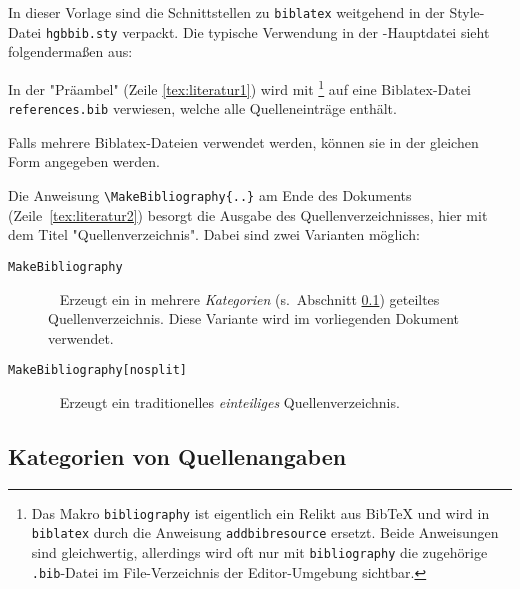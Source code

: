 In dieser Vorlage sind die Schnittstellen zu \texttt{biblatex} weitgehend in der Style-Datei \nolinkurl{hgbbib.sty}
verpackt. Die typische Verwendung in der \latex-Haupt\-datei sieht folgendermaßen aus:
%
%
In der "Präambel" (Zeile \ref{tex:literatur1}) wird mit \verb!!%
\footnote{Das Makro \texttt{{\bs}bibliography} ist eigentlich ein Relikt aus BibTeX und wird in \texttt{biblatex}
durch die Anweisung \texttt{{\bs}addbibresource} ersetzt. Beide Anweisungen sind gleichwertig, allerdings wird oft
nur mit \texttt{{\bs}bibliography} die zugehörige \texttt{.bib}-Datei im File-Verzeichnis der Editor-Umgebung sichtbar.}
auf eine Biblatex-Datei \nolinkurl{references.bib} verwiesen, welche alle Quelleneinträge enthält.%

Falls mehrere Biblatex-Dateien verwendet werden, können sie in der gleichen Form angegeben werden.

Die Anweisung \verb!! am Ende des Dokuments (Zeile~\ref{tex:literatur2}) besorgt die Ausgabe des
Quellenverzeichnisses, hier mit dem Titel "Quellenverzeichnis". Dabei sind zwei Varianten möglich:
%
\begin{description}
\item[\texttt{{\bs}MakeBibliography}] ~ \newline
	Erzeugt ein in mehrere \emph{Kategorien} (s.\ Abschnitt \ref{sec:BibKategorien}) geteiltes Quellenverzeichnis. Diese
	Variante wird im vorliegenden Dokument verwendet.
\item[\texttt{{\bs}MakeBibliography[nosplit]}] ~ \newline
	Erzeugt ein traditionelles \emph{einteiliges} Quellenverzeichnis.
\end{description}


\subsection{Kategorien von Quellenangaben}
\label{sec:BibKategorien}

